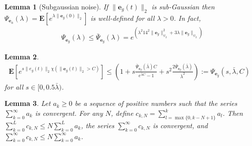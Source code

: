 \documentclass[10pt,a4paper]{amsart}
\newtheorem{lemma}{Lemma}
\newcommand{\bE}{\mathbf{E}}
\newcommand{\e}{\mathbf{e}}
\def\rve{{\mathbf{e}}}
\begin{document}
\begin{lemma}[Subgaussian noise]
\label{lemma:subgauss:Cramer}
If
$\|\e_g(t)\|_2$ is sub-Gaussian  then
$\Psi_{\e_a}(\lambda)=\bE[e^{\lambda \|\e_g(0)\|_2}]$ 
 is well-defined for all $\lambda > 0$.
In fact, %
\begin{align*}
& \Psi_{\e_g}(\lambda) \le  \bar{\Psi}_{\rve_g}(\lambda)=e^{(\lambda^2 14^2 \|\rve_g\|_{\psi_2}^2+3\lambda \|\rve_g\|_{\psi_2})}
\end{align*}
\end{lemma}

\begin{lemma}
\label{noise:boundC}
\begin{align*} 
     \bE[e^{s \|e_g(t)\|_2 \chi(\|\e_g(t)\|_2 > C)}]
     \le 
     \left(1+ s 
         \frac{\bar{\Psi}_{\rve_g}(\bar{\lambda})C}{e^{\bar{\lambda}C}-1} + s^2
         \frac{2\bar{\Psi}_{\rve_g}(\bar{\lambda})}{\bar{\lambda}^2}\right):=\Psi_{\rve_g}(s,\bar{\lambda},C)
 \end{align*}
 for all $s \in [0,0.5\bar{\lambda})$. 
\end{lemma}

\begin{lemma}
\label{basic_lemma:lipschitz:lemma_aux}
  Let $a_k \ge 0$ be a sequence of positive numbers such that the series $\sum_{k=0}^{\infty} a_k$ is convergent. For any $N$, define
  $c_{k,N}=\sum_{l=\max\{0,k-N+1\}}^k a_l$. Then  $\sum_{k=0}^{L} c_{k,N} \le N \sum_{k=0}^{L} a_k$, 
  the series $\sum_{k=0}^{\infty} c_{k,N}$ is convergent, and $\sum_{k=0}^{\infty} c_{k,N} \le N \sum_{k=0}^{\infty} a_k$. 
\end{lemma}
\end{document}

